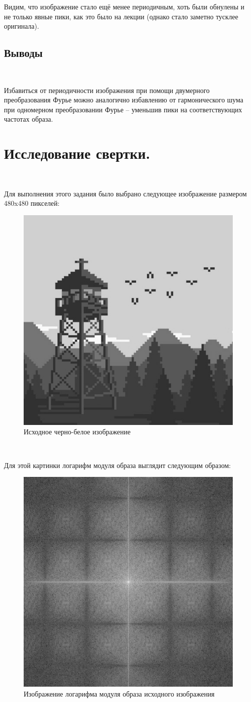 \documentclass[a4paper]{article}
\begin{document}
Видим, что изображение стало ещё менее периодичным, хоть были обнулены и не только явные пики, как это было на лекции (однако стало заметно тусклее оригинала).

\subsection{Выводы}\ 

Избавиться от периодичности изображения при помощи двумерного преобразования Фурье можно аналогично избавлению от гармонического шума при одномерном преобразовании Фурье -- уменьшив пики на соответствующих частотах образа.

\section{Исследование свертки.}\

Для выполнения этого задания было выбрано следующее изображение размером 480x480 пикселей:

\begin{figure}[H]
    \centering
    \includegraphics[width=0.51\linewidth]{2/image.png}
    \caption{Исходное черно-белое изображение}
\end{figure}\

Для этой картинки логарифм модуля образа выглядит следующим образом:

\begin{figure}[H]
    \centering
    \includegraphics[width=0.51\linewidth]{2/abs_fourier_log_norm_image.png}
    \caption{Изображение логарифма модуля образа исходного изображения}
\end{figure}\
\end{document}
